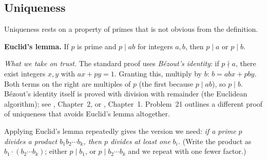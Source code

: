 \subsection{Uniqueness}

Uniqueness rests on a property of primes that is not obvious from the definition.

\begin{beyond}
\textbf{Euclid's lemma.} If $p$ is prime and $p\mid ab$ for integers $a,b$, then $p\mid a$ or $p\mid b$.

\emph{What we take on trust.} The standard proof uses \emph{B\'ezout's identity}: if $p\nmid a$, there exist integers $x,y$ with $ax+py=1$. Granting this, multiply by $b$: $b=abx+pby$. Both terms on the right are multiples of $p$ (the first because $p\mid ab$), so $p\mid b$. B\'ezout's identity itself is proved with division with remainder (the Euclidean algorithm); see \cite{hardywright}, Chapter~2, or \cite{apostol}, Chapter~1. Problem~21 outlines a different proof of uniqueness that avoids Euclid's lemma altogether.
\end{beyond}

Applying Euclid's lemma repeatedly gives the version we need: \emph{if a prime $p$ divides a product $b_1b_2\cdots b_k$, then $p$ divides at least one $b_i$.} (Write the product as $b_1\cdot(b_2\cdots b_k)$; either $p\mid b_1$, or $p\mid b_2\cdots b_k$ and we repeat with one fewer factor.)

